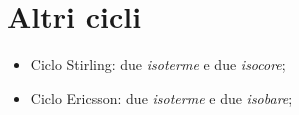 \section{Altri cicli}

\begin{itemize}
    \item Ciclo Stirling: due \emph{isoterme} e due \emph{isocore};
    \item Ciclo Ericsson: due \emph{isoterme} e due \emph{isobare};
\end{itemize}
